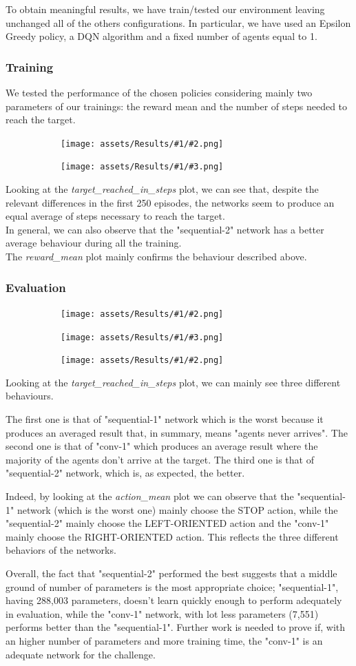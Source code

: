 \documentclass[13pt]{article}
\newcommand{\figrowtwo}[3]{ %
    \begin{figure}[H]
        \centering
        \begin{subfigure}[b]{0.49\textwidth}
            \centering
            \texttt{[image: assets/Results/\#1/\#2.png]}
        \end{subfigure}
        \hfill
        \begin{subfigure}[b]{0.49\textwidth}
            \centering
            \texttt{[image: assets/Results/\#1/\#3.png]}
        \end{subfigure}
    \end{figure}
}
\newcommand{\figrowone}[2]{ %
    \begin{figure}[H]
        \centering
        \begin{subfigure}[b]{0.49\textwidth}
            \centering
            \texttt{[image: assets/Results/\#1/\#2.png]}
        \end{subfigure}
    \end{figure}
}
\begin{document}
To obtain meaningful results, we have train/tested our environment leaving unchanged all of the others configurations. 
In particular, we have used an Epsilon Greedy policy, a DQN algorithm and a fixed number of agents equal to 1.

\subsubsection*{Training}
We tested the performance of the chosen policies considering mainly two parameters of our trainings: the reward mean and the number of steps needed to reach the target.

\figrowtwo{Architecture/Train}{reward_mean}{target_reached_in_steps}
Looking at the \emph{target\_reached\_in\_steps} plot, we can see that, despite the relevant differences in the first 250 episodes, the networks seem to produce an equal average of steps necessary to reach the target. \\
In general, we can also observe that the "sequential-2" network has a better average behaviour during all the training.\\

The \emph{reward\_mean} plot mainly confirms the behaviour described above.

\subsubsection*{Evaluation}
\figrowtwo{Architecture/Test}{reward_mean}{target_reached_in_steps}
\figrowone{Architecture/Test}{action_mean}

Looking at the \emph{target\_reached\_in\_steps} plot, we can mainly see three different behaviours. 

The first one is that of "sequential-1" network which is the worst because it produces an averaged result that, in summary, means "agents never arrives".
The second one is that of "conv-1" which produces an average result where the majority of the agents don't arrive at the target.
The third one is that of "sequential-2" network, which is, as expected, the better.

Indeed, by looking at the \emph{action\_mean} plot we can observe that the "sequential-1" network (which is the worst one) mainly choose the STOP action, while the "sequential-2" mainly choose the LEFT-ORIENTED action and the "conv-1" mainly choose the RIGHT-ORIENTED action.
This reflects the three different behaviors of the networks.

Overall, the fact that "sequential-2" performed the best suggests that a middle ground of number of parameters is the most appropriate choice; "sequential-1", having 288,003 parameters, doesn't learn quickly enough to perform adequately in evaluation, while the "conv-1" network, with lot less parameters (7,551) performs better than the "sequential-1". Further work is needed to prove if, with an higher number of parameters and more training time, the "conv-1" is an adequate network for the challenge.
\end{document}
